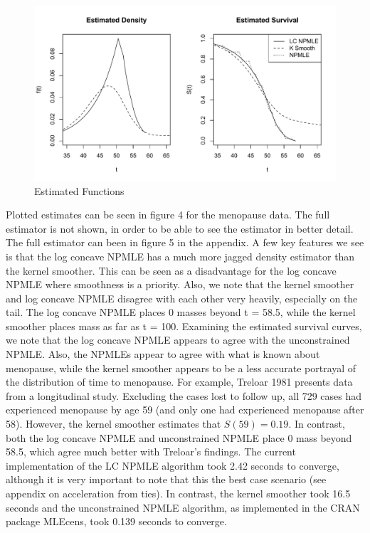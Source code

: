 \documentclass[10pt]{article}
\begin{document}
\begin{figure}[h]
\centerline{\includegraphics[width = 12cm]{MenoPlot.pdf}}
\caption{Estimated Functions}
\end{figure}		
	
	Plotted estimates can be seen in figure 4 for the menopause data. The full estimator is not shown, in order to be able to see the estimator in better detail. The full estimator can been in figure 5 in the appendix. A few key features we see is that the log concave NPMLE has a much more jagged density estimator than the kernel smoother. This can be seen as a disadvantage for the log concave NPMLE where smoothness is a priority. Also, we note that the kernel smoother and log concave NPMLE disagree with each other very heavily, especially on the tail. The log concave NPMLE places 0 masses beyond t = 58.5, while the kernel smoother places mass as far as t = 100. Examining the estimated survival curves, we note that the log concave NPMLE appears to agree with the unconstrained NPMLE. Also, the NPMLEs appear to agree with what is known about menopause, while the kernel smoother appears to be a less accurate portrayal of the distribution of time to menopause. For example, Treloar 1981 presents data from a longitudinal study. Excluding the cases lost to follow up, all 729 cases had experienced menopause by age 59 (and only one had experienced menopause after 58). However, the kernel smoother estimates that $S(59) =  0.19$. In contrast, both the log concave NPMLE and unconstrained NPMLE place 0 mass beyond 58.5, which agree much better with Treloar's findings. The current implementation of the LC NPMLE algorithm took 2.42 seconds to converge, although it is very important to note that this the best case scenario (see appendix on acceleration from ties). In contrast, the kernel smoother took 16.5 seconds and the unconstrained NPMLE algorithm, as implemented in the CRAN package  MLEcens, took 0.139 seconds to converge. 
	
\end{document}
